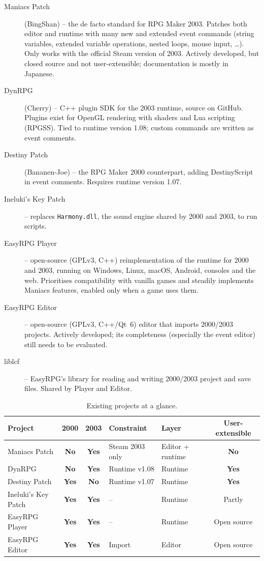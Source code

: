 \documentclass[11pt,a4paper]{article}
\newcommand{\yes}{\textcolor{yescol}{\textbf{Yes}}}
\newcommand{\no}{\textcolor{nocol}{\textbf{No}}}
\begin{document}
\begin{description}
  \item[Maniacs Patch] (BingShan) -- the de facto standard for RPG Maker 2003. Patches
        both editor and runtime with many new and extended event commands (string
        variables, extended variable operations, nested loops, mouse input, \ldots).
        Only works with the official Steam version of 2003. Actively developed, but
        closed source and not user-extensible; documentation is mostly in Japanese.
  \item[DynRPG] (Cherry) -- C++ plugin SDK for the 2003 runtime, source on GitHub.
        Plugins exist for OpenGL rendering with shaders and Lua scripting (RPGSS).
        Tied to runtime version 1.08; custom commands are written as event comments.
  \item[Destiny Patch] (Bananen-Joe) -- the RPG Maker 2000 counterpart, adding
        DestinyScript in event comments. Requires runtime version 1.07.
  \item[Ineluki's Key Patch] -- replaces \texttt{Harmony.dll}, the sound engine shared
        by 2000 and 2003, to run scripts.
  \item[EasyRPG Player] -- open-source (GPLv3, C++) reimplementation of the runtime for
        2000 and 2003, running on Windows, Linux, macOS, Android, consoles and the web.
        Prioritises compatibility with vanilla games and steadily implements Maniacs
        features, enabled only when a game uses them.
  \item[EasyRPG Editor] -- open-source (GPLv3, C++/Qt~6) editor that imports 2000/2003
        projects. Actively developed; its completeness (especially the event editor)
        still needs to be evaluated.
  \item[liblcf] -- EasyRPG's library for reading and writing 2000/2003 project and save
        files. Shared by Player and Editor.
\end{description}

\begin{table}[h]
\centering
\small
\begin{tabularx}{\textwidth}{@{}l c c l l c@{}}
\toprule
\textbf{Project} & \textbf{2000} & \textbf{2003} & \textbf{Constraint} & \textbf{Layer} & \textbf{User-extensible} \\
\midrule
Maniacs Patch       & \no  & \yes & Steam 2003 only   & Editor + runtime & \no \\
DynRPG              & \no  & \yes & Runtime v1.08     & Runtime          & \yes \\
Destiny Patch       & \yes & \no  & Runtime v1.07     & Runtime          & \yes \\
Ineluki's Key Patch & \yes & \yes & --                & Runtime          & Partly \\
EasyRPG Player      & \yes & \yes & --                & Runtime          & Open source \\
EasyRPG Editor      & \yes & \yes & Import            & Editor           & Open source \\
\bottomrule
\end{tabularx}
\caption{Existing projects at a glance.}
\end{table}
\end{document}
